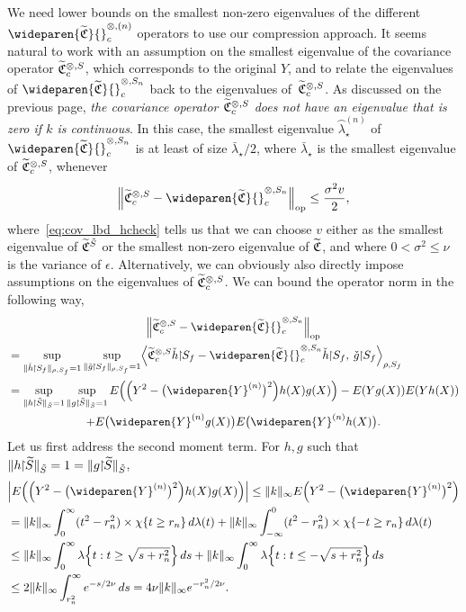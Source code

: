 \documentclass[AHL,Unicode,longabstracts,published]{cedram}
\theoremstyle{remark}
\DeclareMathOperator{\opp}{op}
\newcommand{\restrr}
{\!\!\upharpoonright\!\!}
\newcommand{\resttr}
{\!\upharpoonright\!}
\newcommand{\fkC}{\mathfrak{C}}
\newcommand{\Cov}{\tilde{\fkC}}
\newcommand{\CovCap}{\wideparen{\widetilde{\fkC}}{\vphantom{\fkC}}^{\otimes,(n)}_c}
\newcommand{\CovCapn}{\wideparen{\widetilde{\fkC}}{\vphantom{\fkC}}^{\otimes,S_n}_c}
\newcommand*{\mk}{\mkern -1mu}
\let\oldtilde\tilde
\renewcommand*{\tilde}[1]{\mathchoice{\widetilde{#1}}{\widetilde{#1}}{\oldtilde{#1}}{\oldtilde{#1}}}
\let\originalleft\left
\let\originalright\right
\renewcommand{\left}{\mathopen{}\mathclose\bgroup\originalleft}
\renewcommand{\right}{\aftergroup\egroup\originalright}
\begin{document}
We need lower bounds on the smallest non-zero eigenvalues of the different $\CovCap$ operators to use our compression approach. It seems natural to work with an assumption on the smallest eigenvalue of the covariance operator $\tilde{\fkC}^{\otimes,S}_c$, which corresponds to the original $Y$, and to relate the eigenvalues of $\CovCapn$ back to the eigenvalues of~$\tilde{\fkC}^{\otimes,S}_c$. As discussed on the previous page, \emph{the covariance operator $\tilde{\fkC}^{\otimes,S}_c$ does not have an eigenvalue that is zero if $k$ is continuous}. In this case, the smallest eigenvalue $\wideparen{\lambda}^{(n)}_\star$ of $\CovCapn$ is at least of size $\bar \lambda_\star/2$, where $\bar \lambda_\star$ is the smallest eigenvalue of $\tilde{\fkC}^{\otimes,S}_c$, whenever
\[
\left\| \tilde{\fkC}^{\otimes,S}_c - \CovCapn\right\|_{\opp} \leq \frac{\sigma^2 v}{2},
\]
where~\eqref{eq:cov_lbd_hcheck} tells us that we can choose $v$ either as the smallest eigenvalue of $\Cov^{\tilde S}$ or the smallest non-zero eigenvalue of $\Cov$, and where $0< \sigma^2 \leq \nu$ is the variance of $\epsilon$. Alternatively, we can obviously also directly impose assumptions on the eigenvalues of $\tilde{\fkC}^{\otimes,S}_c$. We can bound the operator norm in the following way,
\begin{multline*}
\left\| \tilde{\fkC}^{\otimes,S}_c - \CovCapn \right\|_{\opp} \\
\begin{aligned}
&=
\sup_{\| \check h \mk\upharpoonright\mk S_f\|_{\rho,S_f} =1} \sup_{\| \check g \mk\upharpoonright\mk S_f\|_{\rho,S_f} =1%
}
\left\langle \Cov^{\otimes,S}_c \check h \restrr S_f- \CovCapn \check h \restrr S_f,\: \check g \restrr S_f \right\rangle_{\rho,S_f} \\
&= \sup_{\| h \mk\upharpoonright\mk \tilde S\|_{\tilde S} = 1} \sup_{\| g \mk\upharpoonright\mk \tilde S\|_{\tilde S} = 1} E\left(\left(Y^2 - \bigl(\wideparen{Y}^{(n)}\bigr)^2\right) h(X)g(X)\right)- E(Y g(X)) E(Y h(X)) \\
\end{aligned}\\
+ E\bigl(\wideparen{Y}^{(n)} g(X)\bigr) E\bigl(\wideparen{Y}^{(n)} h(X)\bigr).
\end{multline*}
Let us first address the second moment term. For $h,g$ such that $\| h \restrr \tilde S\|_{\tilde S} = 1 = \| g \restrr \tilde S\|_{\tilde S} $,
\begin{align*}
&\left|E\left(\left(Y^2 - \bigl(\wideparen{Y}^{(n)}\bigr)^2\right) h(X)g(X)\right)\right| \leq \|k\|_\infty E\left(Y^2 - \bigl(\wideparen{Y}^{(n)}\bigr)^2\right) \\
&= \|k\|_\infty \int_0^\infty (t^2 - r_n^2) \times \chi\{t \geq r_n \} \,d \lambda(t) + \|k\|_\infty \int_{-\infty}^0 (t^2 - r_n^2) \times \chi \{ -t \geq r_n\} \, d\lambda(t) \\
&\leq \|k\|_\infty \int_{0}^\infty \lambda\left\{t: t \geq \sqrt{s + r_n^2}\right\} \,ds + \|k\|_\infty \int_0^\infty \lambda\left\{t: t\leq - \sqrt{s + r_n^2} \right\} \, ds \\
&\leq 2 \|k\|_\infty \int_{r_n^2}^\infty e^{-s /2 \nu} \, ds = 4\nu \|k\|_\infty e^{-r^2_n/2 \nu}.
\end{align*}
\end{document}
